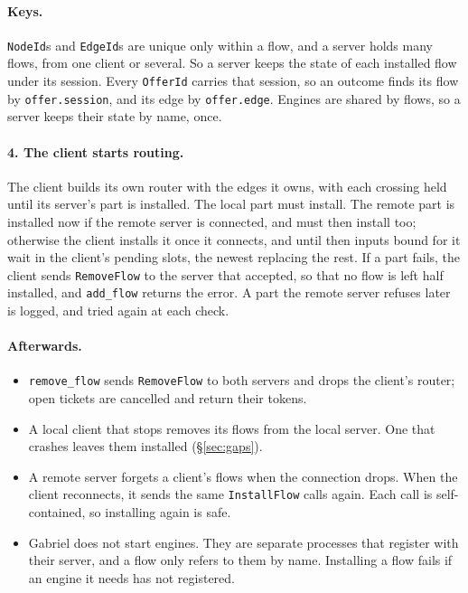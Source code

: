 \documentclass[11pt]{article}
\newcommand{\code}[1]{\texttt{#1}}
\begin{document}
\paragraph{Keys.} \code{NodeId}s and \code{EdgeId}s are unique only within a
flow, and a server holds many flows, from one client or several. So a server
keeps the state of each installed flow under its session. Every
\code{OfferId} carries that session, so an outcome finds its flow by
\code{offer.session}, and its edge by \code{offer.edge}. Engines are shared
by flows, so a server keeps their state by name, once.

\paragraph{4. The client starts routing.} The client builds its own router
with the edges it owns, with each crossing held until its server's part is
installed. The local part must install. The remote part is installed now if
the remote server is connected, and must then install too; otherwise the
client installs it once it connects, and until then inputs bound for it wait
in the client's pending slots, the newest replacing the rest. If a part
fails, the client sends \code{RemoveFlow} to the server that accepted, so
that no flow is left half installed, and \code{add\_flow} returns the error.
A part the remote server refuses later is logged, and tried again at each
check.

\paragraph{Afterwards.}
\begin{itemize}[nosep]
  \item \code{remove\_flow} sends \code{RemoveFlow} to both servers and drops
        the client's router; open tickets are cancelled and return their
        tokens.
  \item A local client that stops removes its flows from the local server.
        One that crashes leaves them installed (\S\ref{sec:gaps}).
  \item A remote server forgets a client's flows when the connection drops.
        When the client reconnects, it sends the same \code{InstallFlow}
        calls again. Each call is self-contained, so installing again is safe.
  \item Gabriel does not start engines. They are separate processes that
        register with their server, and a flow only refers to them by name.
        Installing a flow fails if an engine it needs has not registered.
\end{itemize}
\end{document}
